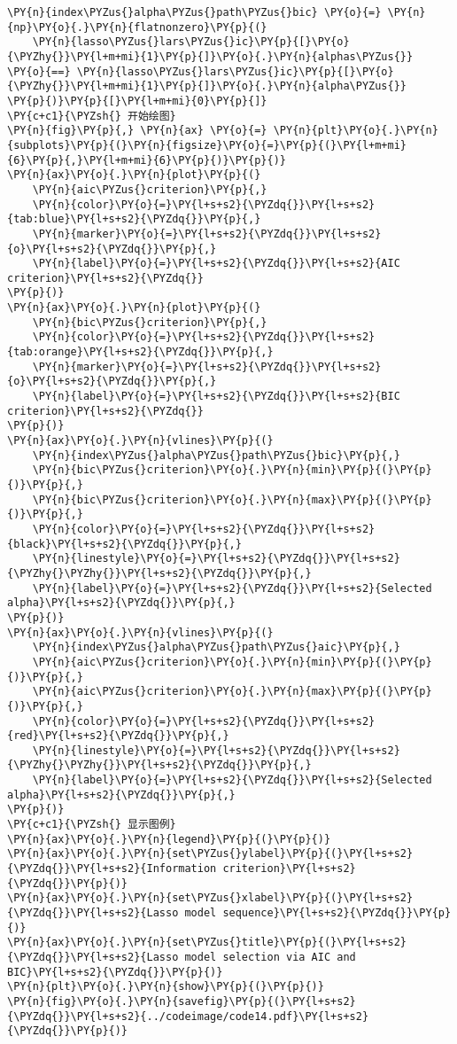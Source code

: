 \begin{Verbatim}[commandchars=\\\{\}]
\PY{n}{index\PYZus{}alpha\PYZus{}path\PYZus{}bic} \PY{o}{=} \PY{n}{np}\PY{o}{.}\PY{n}{flatnonzero}\PY{p}{(}
    \PY{n}{lasso\PYZus{}lars\PYZus{}ic}\PY{p}{[}\PY{o}{\PYZhy{}}\PY{l+m+mi}{1}\PY{p}{]}\PY{o}{.}\PY{n}{alphas\PYZus{}} \PY{o}{==} \PY{n}{lasso\PYZus{}lars\PYZus{}ic}\PY{p}{[}\PY{o}{\PYZhy{}}\PY{l+m+mi}{1}\PY{p}{]}\PY{o}{.}\PY{n}{alpha\PYZus{}}
\PY{p}{)}\PY{p}{[}\PY{l+m+mi}{0}\PY{p}{]}
\PY{c+c1}{\PYZsh{} 开始绘图}
\PY{n}{fig}\PY{p}{,} \PY{n}{ax} \PY{o}{=} \PY{n}{plt}\PY{o}{.}\PY{n}{subplots}\PY{p}{(}\PY{n}{figsize}\PY{o}{=}\PY{p}{(}\PY{l+m+mi}{6}\PY{p}{,}\PY{l+m+mi}{6}\PY{p}{)}\PY{p}{)}
\PY{n}{ax}\PY{o}{.}\PY{n}{plot}\PY{p}{(}
    \PY{n}{aic\PYZus{}criterion}\PY{p}{,} 
    \PY{n}{color}\PY{o}{=}\PY{l+s+s2}{\PYZdq{}}\PY{l+s+s2}{tab:blue}\PY{l+s+s2}{\PYZdq{}}\PY{p}{,} 
    \PY{n}{marker}\PY{o}{=}\PY{l+s+s2}{\PYZdq{}}\PY{l+s+s2}{o}\PY{l+s+s2}{\PYZdq{}}\PY{p}{,} 
    \PY{n}{label}\PY{o}{=}\PY{l+s+s2}{\PYZdq{}}\PY{l+s+s2}{AIC criterion}\PY{l+s+s2}{\PYZdq{}}
\PY{p}{)}
\PY{n}{ax}\PY{o}{.}\PY{n}{plot}\PY{p}{(}
    \PY{n}{bic\PYZus{}criterion}\PY{p}{,} 
    \PY{n}{color}\PY{o}{=}\PY{l+s+s2}{\PYZdq{}}\PY{l+s+s2}{tab:orange}\PY{l+s+s2}{\PYZdq{}}\PY{p}{,} 
    \PY{n}{marker}\PY{o}{=}\PY{l+s+s2}{\PYZdq{}}\PY{l+s+s2}{o}\PY{l+s+s2}{\PYZdq{}}\PY{p}{,} 
    \PY{n}{label}\PY{o}{=}\PY{l+s+s2}{\PYZdq{}}\PY{l+s+s2}{BIC criterion}\PY{l+s+s2}{\PYZdq{}}
\PY{p}{)}
\PY{n}{ax}\PY{o}{.}\PY{n}{vlines}\PY{p}{(}
    \PY{n}{index\PYZus{}alpha\PYZus{}path\PYZus{}bic}\PY{p}{,}
    \PY{n}{bic\PYZus{}criterion}\PY{o}{.}\PY{n}{min}\PY{p}{(}\PY{p}{)}\PY{p}{,}
    \PY{n}{bic\PYZus{}criterion}\PY{o}{.}\PY{n}{max}\PY{p}{(}\PY{p}{)}\PY{p}{,}
    \PY{n}{color}\PY{o}{=}\PY{l+s+s2}{\PYZdq{}}\PY{l+s+s2}{black}\PY{l+s+s2}{\PYZdq{}}\PY{p}{,}
    \PY{n}{linestyle}\PY{o}{=}\PY{l+s+s2}{\PYZdq{}}\PY{l+s+s2}{\PYZhy{}\PYZhy{}}\PY{l+s+s2}{\PYZdq{}}\PY{p}{,}
    \PY{n}{label}\PY{o}{=}\PY{l+s+s2}{\PYZdq{}}\PY{l+s+s2}{Selected alpha}\PY{l+s+s2}{\PYZdq{}}\PY{p}{,}
\PY{p}{)}
\PY{n}{ax}\PY{o}{.}\PY{n}{vlines}\PY{p}{(}
    \PY{n}{index\PYZus{}alpha\PYZus{}path\PYZus{}aic}\PY{p}{,}
    \PY{n}{aic\PYZus{}criterion}\PY{o}{.}\PY{n}{min}\PY{p}{(}\PY{p}{)}\PY{p}{,}
    \PY{n}{aic\PYZus{}criterion}\PY{o}{.}\PY{n}{max}\PY{p}{(}\PY{p}{)}\PY{p}{,}
    \PY{n}{color}\PY{o}{=}\PY{l+s+s2}{\PYZdq{}}\PY{l+s+s2}{red}\PY{l+s+s2}{\PYZdq{}}\PY{p}{,}
    \PY{n}{linestyle}\PY{o}{=}\PY{l+s+s2}{\PYZdq{}}\PY{l+s+s2}{\PYZhy{}\PYZhy{}}\PY{l+s+s2}{\PYZdq{}}\PY{p}{,}
    \PY{n}{label}\PY{o}{=}\PY{l+s+s2}{\PYZdq{}}\PY{l+s+s2}{Selected alpha}\PY{l+s+s2}{\PYZdq{}}\PY{p}{,}
\PY{p}{)}
\PY{c+c1}{\PYZsh{} 显示图例}
\PY{n}{ax}\PY{o}{.}\PY{n}{legend}\PY{p}{(}\PY{p}{)}
\PY{n}{ax}\PY{o}{.}\PY{n}{set\PYZus{}ylabel}\PY{p}{(}\PY{l+s+s2}{\PYZdq{}}\PY{l+s+s2}{Information criterion}\PY{l+s+s2}{\PYZdq{}}\PY{p}{)}
\PY{n}{ax}\PY{o}{.}\PY{n}{set\PYZus{}xlabel}\PY{p}{(}\PY{l+s+s2}{\PYZdq{}}\PY{l+s+s2}{Lasso model sequence}\PY{l+s+s2}{\PYZdq{}}\PY{p}{)}
\PY{n}{ax}\PY{o}{.}\PY{n}{set\PYZus{}title}\PY{p}{(}\PY{l+s+s2}{\PYZdq{}}\PY{l+s+s2}{Lasso model selection via AIC and BIC}\PY{l+s+s2}{\PYZdq{}}\PY{p}{)}
\PY{n}{plt}\PY{o}{.}\PY{n}{show}\PY{p}{(}\PY{p}{)}
\PY{n}{fig}\PY{o}{.}\PY{n}{savefig}\PY{p}{(}\PY{l+s+s2}{\PYZdq{}}\PY{l+s+s2}{../codeimage/code14.pdf}\PY{l+s+s2}{\PYZdq{}}\PY{p}{)}
\end{Verbatim}
